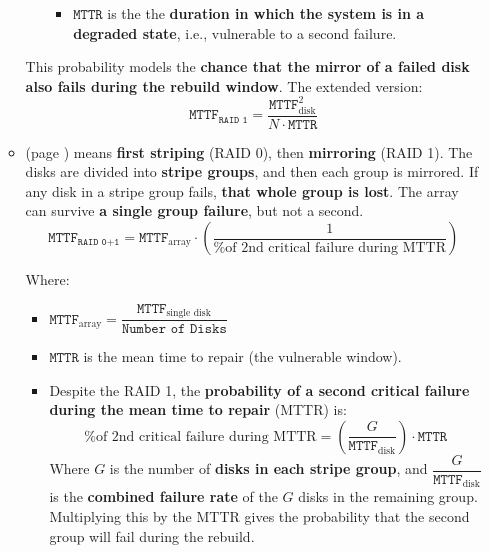 \begin{itemize}
\begin{itemize}
\begin{itemize}
\begin{itemize}
                \item $\texttt{MTTR}$ is the the \textbf{duration in which the system is in a degraded state}, i.e., vulnerable to a second failure.
            \end{itemize}
        \end{itemize}
        This probability models the \textbf{chance that the mirror of a failed disk also fails during the rebuild window}. The extended version:
        \begin{equation}\label{eq: RAID 1 - MTTF}
            \texttt{MTTF}_{\texttt{RAID 1}} = \dfrac{\texttt{MTTF}_{\text{disk}}^{2}}{N \cdot \texttt{MTTR}}
        \end{equation}

        \item {} (page ) means \textbf{first striping} (RAID 0), then \textbf{mirroring} (RAID 1). The disks are divided into \textbf{stripe groups}, and then each group is mirrored. If any disk in a stripe group fails, \textbf{that whole group is lost}. The array can survive \textbf{a single group failure}, but not a second.
        \begin{equation}
            \texttt{MTTF}_{\texttt{RAID 0+1}} = \texttt{MTTF}_{\text{array}} \cdot \left(
                \dfrac{1}{\text{\% of 2nd critical failure during MTTR}}
            \right)
        \end{equation}

        \newpage

        Where:
        \begin{itemize}
            \item $\texttt{MTTF}_{\text{array}} = \dfrac{\texttt{MTTF}_{\text{single disk}}}{\texttt{Number of Disks}}$
            \item $\texttt{MTTR}$ is the mean time to repair (the vulnerable window).
            \item Despite the RAID 1, the \textbf{probability of a second critical failure during the mean time to repair} (MTTR) is:
            \begin{equation}
                \text{\% of 2nd critical failure during MTTR} = \left(\dfrac{G}{\texttt{MTTF}_{\text{disk}}}\right) \cdot \texttt{MTTR}
            \end{equation}
            Where $G$ is the number of \textbf{disks in each stripe group}, and $\dfrac{G}{\texttt{MTTF}_{\text{disk}}}$ is the \textbf{combined failure rate} of the $G$ disks in the remaining group. Multiplying this by the MTTR gives the probability that the second group will fail during the rebuild.
            

\end{itemize}
\end{itemize}
\end{itemize}
